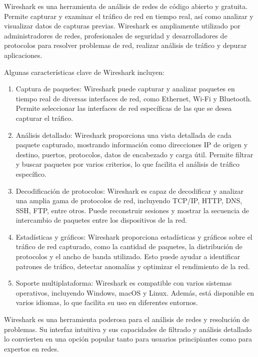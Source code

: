 \documentclass[a4paper, 12pt]{book}
\begin{document}
	Wireshark es una herramienta de análisis de redes de código abierto y gratuita. Permite capturar y examinar el tráfico de red en tiempo real, así como analizar y visualizar datos de capturas previas. Wireshark es ampliamente utilizado por administradores de redes, profesionales de seguridad y desarrolladores de protocolos para resolver problemas de red, realizar análisis de tráfico y depurar aplicaciones.
	
	Algunas características clave de Wireshark incluyen:
	
	\begin{enumerate}
		\item 	Captura de paquetes: Wireshark puede capturar y analizar paquetes en tiempo real de diversas interfaces de red, como Ethernet, Wi-Fi y Bluetooth. Permite seleccionar las interfaces de red específicas de las que se desea capturar el tráfico.	
		\item 	Análisis detallado: Wireshark proporciona una vista detallada de cada paquete capturado, mostrando información como direcciones IP de origen y destino, puertos, protocolos, datos de encabezado y carga útil. Permite filtrar y buscar paquetes por varios criterios, lo que facilita el análisis de tráfico específico.
		\item 	Decodificación de protocolos: Wireshark es capaz de decodificar y analizar una amplia gama de protocolos de red, incluyendo TCP/IP, HTTP, DNS, SSH, FTP, entre otros. Puede reconstruir sesiones y mostrar la secuencia de intercambio de paquetes entre los dispositivos de la red.
		\item 	Estadísticas y gráficos: Wireshark proporciona estadísticas y gráficos sobre el tráfico de red capturado, como la cantidad de paquetes, la distribución de protocolos y el ancho de banda utilizado. Esto puede ayudar a identificar patrones de tráfico, detectar anomalías y optimizar el rendimiento de la red.
		\item   Soporte multiplataforma: Wireshark es compatible con varios sistemas operativos, incluyendo Windows, macOS y Linux. Además, está disponible en varios idiomas, lo que facilita su uso en diferentes entornos.
	\end{enumerate}
	
	
	Wireshark es una herramienta poderosa para el análisis de redes y resolución de problemas. Su interfaz intuitiva y sus capacidades de filtrado y análisis detallado lo convierten en una opción popular tanto para usuarios principiantes como para expertos en redes.
	
\end{document}
